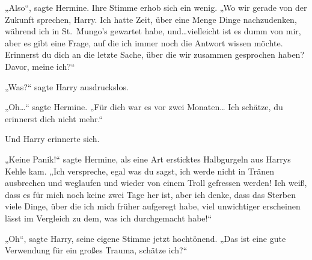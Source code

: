„Also“, sagte Hermine. Ihre Stimme erhob sich ein wenig. „Wo wir gerade von der Zukunft sprechen, Harry. Ich hatte Zeit, über eine Menge Dinge nachzudenken, während ich in St.~Mungo’s gewartet habe, und…vielleicht ist es dumm von mir, aber es gibt eine Frage, auf die ich immer noch die Antwort wissen möchte.
Erinnerst du dich an die letzte Sache, über die wir zusammen gesprochen haben? Davor, meine ich?“

„Was?“ sagte Harry ausdruckslos.

„Oh…“ sagte Hermine. „Für dich war es vor zwei Monaten… Ich schätze, du erinnerst dich nicht mehr.“

Und Harry erinnerte sich.

„Keine Panik!“ sagte Hermine, als eine Art ersticktes Halbgurgeln aus Harrys Kehle kam. „Ich verspreche, egal was du sagst, ich werde nicht in Tränen ausbrechen und weglaufen und wieder von einem Troll gefressen werden! Ich weiß, dass es für mich noch keine zwei Tage her ist, aber ich denke, dass das Sterben viele Dinge, über die ich mich früher aufgeregt habe, viel unwichtiger erscheinen lässt im Vergleich zu dem, was ich durchgemacht habe!“

„Oh“, sagte Harry, seine eigene Stimme jetzt hochtönend. „Das ist eine gute Verwendung für ein großes Trauma, schätze ich?“

